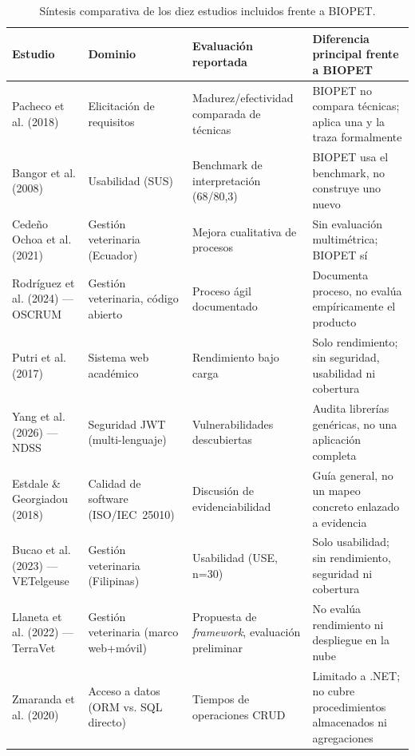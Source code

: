 \begin{table}[H]
  \centering
  \tiny
  \caption{S\'intesis comparativa de los diez estudios incluidos frente a BIOPET.}
  \label{tab:sintesis-relacionados}
  \begin{tabular}{@{}p{2.4cm}p{2.2cm}p{3.0cm}p{4.8cm}@{}}
    \toprule
    Estudio & Dominio & Evaluaci\'on reportada & Diferencia principal frente a BIOPET \\
    \midrule
    Pacheco et al. (2018) & Elicitaci\'on de requisitos & Madurez/efectividad comparada de t\'ecnicas & BIOPET no compara t\'ecnicas; aplica una y la traza formalmente \\
    Bangor et al. (2008) & Usabilidad (SUS) & Benchmark de interpretaci\'on (68/80{,}3) & BIOPET usa el benchmark, no construye uno nuevo \\
    Cede\~no Ochoa et al. (2021) & Gesti\'on veterinaria (Ecuador) & Mejora cualitativa de procesos & Sin evaluaci\'on multim\'etrica; BIOPET s\'i \\
    Rodr\'iguez et al. (2024) --- OSCRUM & Gesti\'on veterinaria, c\'odigo abierto & Proceso \'agil documentado & Documenta proceso, no eval\'ua emp\'iricamente el producto \\
    Putri et al. (2017) & Sistema web acad\'emico & Rendimiento bajo carga & Solo rendimiento; sin seguridad, usabilidad ni cobertura \\
    Yang et al. (2026) --- NDSS & Seguridad JWT (multi-lenguaje) & Vulnerabilidades descubiertas & Audita librer\'ias gen\'ericas, no una aplicaci\'on completa \\
    Estdale \& Georgiadou (2018) & Calidad de software (ISO/IEC~25010) & Discusi\'on de evidenciabilidad & Gu\'ia general, no un mapeo concreto enlazado a evidencia \\
    Bucao et al. (2023) --- VETelgeuse & Gesti\'on veterinaria (Filipinas) & Usabilidad (USE, n=30) & Solo usabilidad; sin rendimiento, seguridad ni cobertura \\
    Llaneta et al. (2022) --- TerraVet & Gesti\'on veterinaria (marco web+m\'ovil) & Propuesta de \emph{framework}, evaluaci\'on preliminar & No eval\'ua rendimiento ni despliegue en la nube \\
    Zmaranda et al. (2020) & Acceso a datos (ORM vs. SQL directo) & Tiempos de operaciones CRUD & Limitado a .NET; no cubre procedimientos almacenados ni agregaciones \\
    \bottomrule
  \end{tabular}
\end{table}

